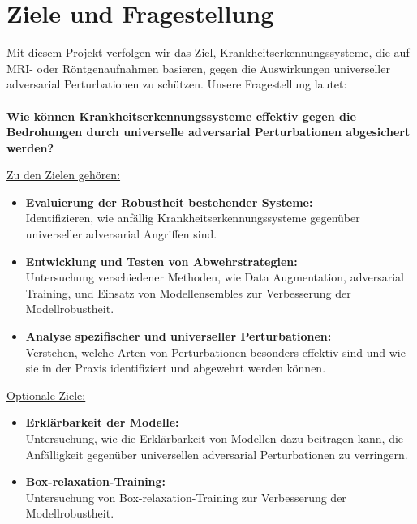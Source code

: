\section{Ziele und Fragestellung}

Mit diesem Projekt verfolgen wir das Ziel, Krankheitserkennungssysteme, die auf MRI- oder Röntgenaufnahmen basieren, gegen die Auswirkungen universeller adversarial Perturbationen zu schützen. Unsere Fragestellung lautet: \\\\ 
\textbf{Wie können Krankheitserkennungssysteme effektiv gegen die Bedrohungen durch universelle adversarial Perturbationen abgesichert werden?}

\underline{Zu den Zielen gehören:}

\begin{itemize}
  \item \textbf{Evaluierung der Robustheit bestehender Systeme:} \\Identifizieren, wie anfällig Krankheitserkennungssysteme gegenüber universeller adversarial Angriffen sind.
  \item \textbf{Entwicklung und Testen von Abwehrstrategien:} 
  \\Untersuchung verschiedener Methoden, wie Data Augmentation, adversarial Training, und Einsatz von Modellensembles zur Verbesserung der Modellrobustheit.
  \item \textbf{Analyse spezifischer und universeller Perturbationen:} \\Verstehen, welche Arten von Perturbationen besonders effektiv sind und wie sie in der Praxis identifiziert und abgewehrt werden können.
\end{itemize}


\underline{Optionale Ziele:} 
\begin{itemize}
\item \textbf{Erklärbarkeit der Modelle:} \\Untersuchung, wie die Erklärbarkeit von Modellen dazu beitragen kann, die Anfälligkeit gegenüber universellen adversarial Perturbationen zu verringern.
\item \textbf{Box-relaxation-Training:} \\
Untersuchung von Box-relaxation-Training zur Verbesserung der Modellrobustheit.
\end{itemize}